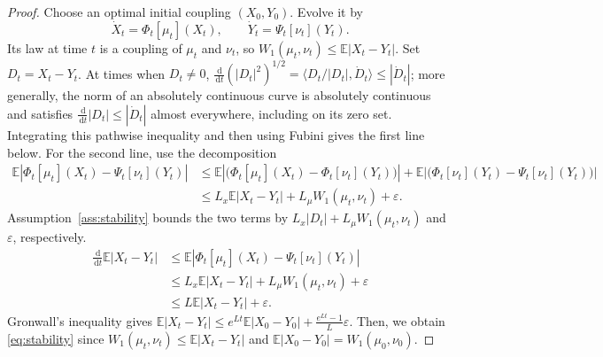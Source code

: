 \documentclass[11pt]{amsart}
\numberwithin{equation}{section}
\theoremstyle{plain}
\newcommand{\E}{\mathbb{E}}
\newcommand{\dd}{\,\mathrm{d}}
\newcommand{\abs}[1]{\left\lvert#1\right\rvert}
\begin{document}
\begin{proof}
Choose an optimal initial coupling
$(X_0,Y_0)$.  Evolve it by
\[
 \dot X_t=\Phi_t[\mu_t](X_t),\qquad
 \dot Y_t=\Psi_t[\nu_t](Y_t).
\]
Its law at time $t$ is a coupling of $\mu_t$ and $\nu_t$, so $W_1(\mu_t,\nu_t)\leq\E\abs{X_t-Y_t}$. 
Set $D_t=X_t-Y_t$.  At times
when $D_t\ne0$,
$\frac{\dd}{\dd t}(|D_t|^2)^{1/2}= \langle D_t/|D_t|,\dot D_t\rangle
\leq|\dot D_t|$; more generally, the norm of an absolutely continuous
curve is absolutely continuous and satisfies
$\frac{\dd}{\dd t}|D_t|\leq|\dot D_t|$ almost everywhere, including on its
zero set.  Integrating this pathwise inequality and then using Fubini gives the
first line below.  For the second line, use the decomposition
\begin{equation}\label{eq:Phi-Psi}
  \begin{aligned}
   \E| \Phi_t[\mu_t](X_t)-\Psi_t[\nu_t](Y_t) |
   & \leq \E |\bigl(\Phi_t[\mu_t](X_t)-\Phi_t[\nu_t](Y_t)\bigr)|
      +\E |\bigl(\Phi_t[\nu_t](Y_t)-\Psi_t[\nu_t](Y_t)\bigr)|  \\
   & \leq L_x\E |X_t-Y_t|+L_\mu W_1(\mu_t,\nu_t)+\varepsilon.
  \end{aligned}
\end{equation}
Assumption~\ref{ass:stability} bounds the two terms by
$L_x|D_t|+L_\mu W_1(\mu_t,\nu_t)$ and $\varepsilon$, respectively.
\begin{align*}
 \frac{\dd}{\dd t}\E\abs{X_t-Y_t}
 &\leq\E\abs{\Phi_t[\mu_t](X_t)
                 -\Psi_t[\nu_t](Y_t)}\\
 &\leq L_x\E\abs{X_t-Y_t}
       +L_\mu W_1(\mu_t,\nu_t)+\varepsilon\\
 &\leq L\E\abs{X_t-Y_t}+\varepsilon.
\end{align*}
Gronwall's inequality gives  $\E\abs{X_t-Y_t}\leq e^{Lt}\E\abs{X_0-Y_0}+\frac{e^{Lt}-1}{L}\varepsilon
 $. Then, we obtain \eqref{eq:stability} since
$W_1(\mu_t,\nu_t)\leq\E\abs{X_t-Y_t}$ and $\E\abs{X_0-Y_0}=W_1(\mu_0,\nu_0)$.
\end{proof}
\end{document}
